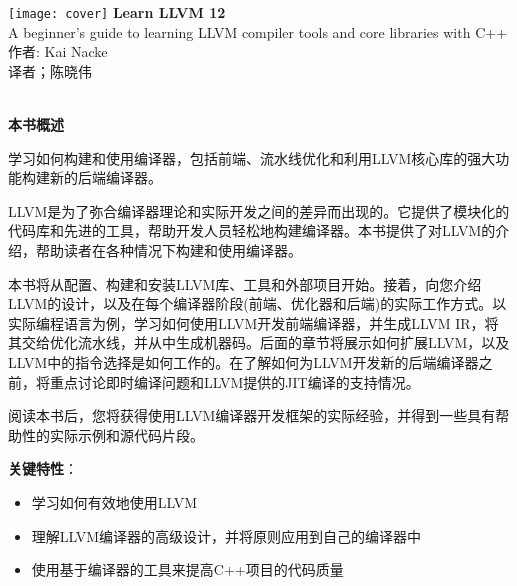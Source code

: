 \documentclass[11pt,a4paper,UTF8]{ctexart}
\begin{document}
	
	\begin{center}
		\texttt{[image: cover]}
		\newpage
		\huge
		\textbf{Learn LLVM 12} 
		\\[9pt]
		\normalsize
		A beginner's guide to learning LLVM compiler tools and core libraries with C++ 
		\\[10pt]
		\normalsize 
		作者: Kai Nacke
		\\[8pt]
		\normalsize
		译者；陈晓伟
	\end{center}
	
	\hspace*{\fill} \\ %
	\noindent\textbf{本书概述}\ \par

	学习如何构建和使用编译器，包括前端、流水线优化和利用LLVM核心库的强大功能构建新的后端编译器。\par
	
	LLVM是为了弥合编译器理论和实际开发之间的差异而出现的。它提供了模块化的代码库和先进的工具，帮助开发人员轻松地构建编译器。本书提供了对LLVM的介绍，帮助读者在各种情况下构建和使用编译器。\par
	
	本书将从配置、构建和安装LLVM库、工具和外部项目开始。接着，向您介绍LLVM的设计，以及在每个编译器阶段(前端、优化器和后端)的实际工作方式。以实际编程语言为例，学习如何使用LLVM开发前端编译器，并生成LLVM IR，将其交给优化流水线，并从中生成机器码。后面的章节将展示如何扩展LLVM，以及LLVM中的指令选择是如何工作的。在了解如何为LLVM开发新的后端编译器之前，将重点讨论即时编译问题和LLVM提供的JIT编译的支持情况。\par
	
	阅读本书后，您将获得使用LLVM编译器开发框架的实际经验，并得到一些具有帮助性的实际示例和源代码片段。\par
	
	\textbf{关键特性}：\par
	
	\begin{itemize}
		\item 学习如何有效地使用LLVM
		\item 理解LLVM编译器的高级设计，并将原则应用到自己的编译器中
		\item 使用基于编译器的工具来提高C++项目的代码质量
	\end{itemize}
	
\end{document}
